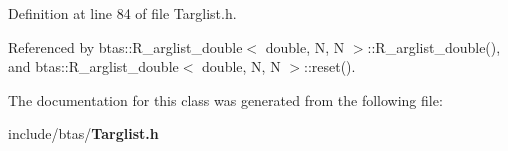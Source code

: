 Definition at line 84 of file Targlist.\-h.



Referenced by btas\-::\-R\-\_\-arglist\-\_\-double$<$ double, N, N $>$\-::\-R\-\_\-arglist\-\_\-double(), and btas\-::\-R\-\_\-arglist\-\_\-double$<$ double, N, N $>$\-::reset().



The documentation for this class was generated from the following file\-:\begin{DoxyCompactItemize}
\item 
include/btas/{\bf Targlist.\-h}\end{DoxyCompactItemize}
